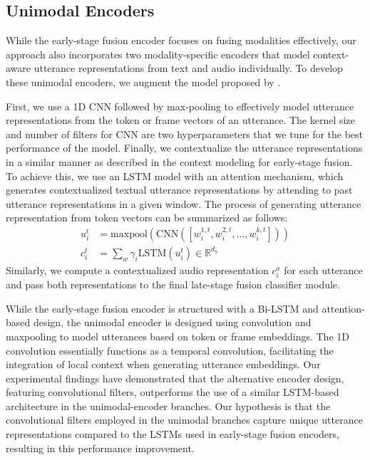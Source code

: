 \subsection{Unimodal Encoders} 

While the early-stage fusion encoder focuses on fusing modalities effectively, our approach also incorporates two modality-specific encoders that model context-aware utterance representations from text and audio individually.
To develop these unimodal encoders, we augment the model proposed by \cite{lexico}.
 
First, we use a 1D CNN followed by max-pooling to effectively model utterance representations from the token or frame vectors of an utterance.
The kernel size and number of filters for CNN are two hyperparameters that we tune for the best performance of the model. Finally, we contextualize the utterance representations in a similar manner as described in the context modeling for early-stage fusion. To achieve this, we use an LSTM model with an attention mechanism, which generates contextualized textual utterance representations by attending to past utterance representations in a given window. The process of generating utterance representation from token vectors can be summarized as follows:
%
\begin{align}
u_{i}^{t} &= \text{{maxpool}}(\text{{CNN}}([w_{i}^{1, t}, w_{i}^{2, t}, \ldots, w_{i}^{k, t}]))\\
c_{i}^{t} &= \sum_w \gamma_{i}\text{LSTM}(u_{i}^{t})\in \mathbb{R}^{d_{h}}
\end{align}
%
Similarly, we compute a contextualized audio representation $c_{i}^{a}$ for each utterance and pass both representations to the final late-stage fusion classifier module.

While the early-stage fusion encoder is structured with a Bi-LSTM and attention-based design, the unimodal encoder is designed using convolution and maxpooling to model utterances based on token or frame embeddings. The 1D convolution essentially functions as a temporal convolution, facilitating the integration of local context when generating utterance embeddings. Our experimental findings have demonstrated that the alternative encoder design, featuring convolutional filters, outperforms the use of a similar LSTM-based architecture in the unimodal-encoder branches. 
Our hypothesis is that the convolutional filters employed in the unimodal branches capture unique utterance representations compared to the LSTMs used in early-stage fusion encoders, resulting in this performance improvement.

